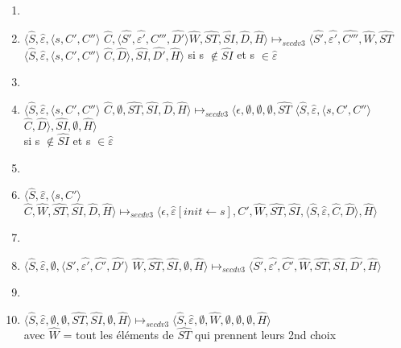 \documentclass[10pt,a4paper]{article}
\begin{document}
\begin{enumerate}
			    	\item[]
			    	\item $\langle\widehat{S},\widehat{\varepsilon},\langle s, C',C''\rangle$ $\widehat{C},\langle\widehat{S'},\widehat{\varepsilon'},C''',\widehat{D'}\rangle\widehat{W},\widehat{ST},\widehat{SI},\widehat{D},\widehat{H}\rangle \longmapsto_{secdv3} \langle\widehat{S'},\widehat{\varepsilon'},\widehat{C'''},\widehat{W},\widehat{ST}$ $\langle\widehat{S},\widehat{\varepsilon},\langle s, C',C''\rangle$ $\widehat{C},\widehat{D}\rangle,\widehat{SI},\widehat{D'},\widehat{H}\rangle$ si s $\notin \widehat{SI}$ et s $\in \widehat{\varepsilon}$ 
			    	\item[]
			    	\item $\langle\widehat{S},\widehat{\varepsilon},\langle s, C',C''\rangle$ $\widehat{C},\emptyset,\widehat{ST},\widehat{SI},\widehat{D},\widehat{H}\rangle \longmapsto_{secdv3} \langle\epsilon,\emptyset,\emptyset,\emptyset,\widehat{ST}$ $\langle\widehat{S},\widehat{\varepsilon},\langle s, C',C''\rangle$ $\widehat{C},\widehat{D}\rangle,\widehat{SI},\emptyset,\widehat{H}\rangle$\\si s $\notin \widehat{SI}$ et s $\in \widehat{\varepsilon}$ 
			    	\item[]
				    \item $\langle\widehat{S},\widehat{\varepsilon},\langle s, C'\rangle$ $\widehat{C},\widehat{W},\widehat{ST},\widehat{SI},\widehat{D},\widehat{H}\rangle \longmapsto_{secdv3} \langle\epsilon,\widehat{\varepsilon}[init \leftarrow s],C',\widehat{W},\widehat{ST},\widehat{SI},\langle\widehat{S},\widehat{\varepsilon},\widehat{C},\widehat{D}\rangle,\widehat{H}\rangle$
				    \item[]
					\item $\langle\widehat{S},\widehat{\varepsilon},\emptyset,\langle\widehat{S'},\widehat{\varepsilon'},\widehat{C'},\widehat{D'}\rangle$ $\widehat{W},\widehat{ST},\widehat{SI},\emptyset,\widehat{H}\rangle \longmapsto_{secdv3} \langle\widehat{S'},\widehat{\varepsilon'},\widehat{C'},\widehat{W},\widehat{ST},\widehat{SI},\widehat{D'},\widehat{H}\rangle$
					\item[]
					\item  $\langle\widehat{S},\widehat{\varepsilon},\emptyset,\emptyset,\widehat{ST},\widehat{SI},\emptyset,\widehat{H}\rangle \longmapsto_{secdv3} \langle\widehat{S},\widehat{\varepsilon},\emptyset,\widehat{W},\emptyset,\emptyset,\emptyset,\widehat{H}\rangle$\\ avec $\widehat{W}$ = tout les éléments de $\widehat{ST}$ qui prennent leurs 2nd choix 

\end{enumerate}
\end{document}
